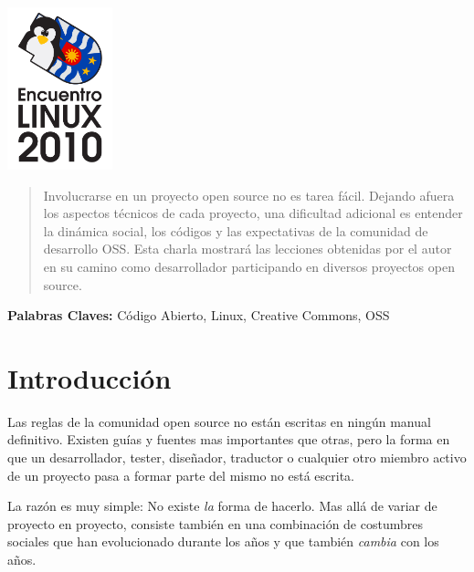 \begin{minipage}{0.1in}
  \includegraphics[width=1.2in]{images/logo.png}
\end{minipage}
\hfill
\begin{minipage}{6in}
  \maketitle
\end{minipage}
\hfill
\begin{minipage}{7in}
\end{minipage}
  \thispagestyle{empty}

\begin{abstract}

  Involucrarse en un proyecto open source no es tarea fácil. Dejando afuera los
  aspectos técnicos de cada proyecto, una dificultad adicional es entender la
  dinámica social, los códigos y las expectativas de la comunidad de desarrollo
  OSS. Esta charla mostrará las lecciones obtenidas por el autor en su camino
  como desarrollador participando en diversos proyectos open source.

\end{abstract}

\textbf{Palabras Claves:} Código Abierto, Linux, Creative Commons, OSS

\section*{Introducción}

Las reglas de la comunidad open source no están escritas en ningún manual
definitivo. Existen guías y fuentes mas importantes que otras, pero la forma en
que un desarrollador, tester, diseñador, traductor o cualquier otro miembro
activo de un proyecto pasa a formar parte del mismo no está escrita.

La razón es muy simple: No existe \emph{la} forma de hacerlo. Mas allá de variar
de proyecto en proyecto, consiste también en una combinación de costumbres
sociales que han evolucionado durante los años y que también \emph{cambia} con
los años.

